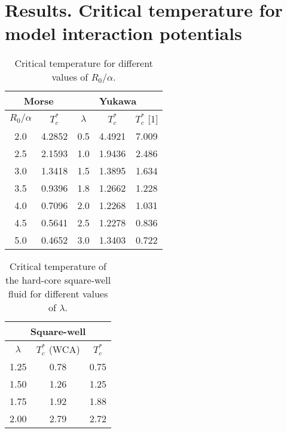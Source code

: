 \section{\label{sec:results}Results. Critical temperature for model interaction potentials}

\begin{table}[h]
	\caption{Critical temperature for different values of $R_0/\alpha$.}
	\begin{center}
		\begin{tabular}{|c|c|c|c|c|}
			\hline
			\multicolumn{2}{|c|}{Morse} & \multicolumn{3}{|c|}{Yukawa}\\
			\hline
			$R_0/\alpha$ \quad & $T_c^*$ \quad & $\lambda$ & $T_c^*$ & $T_c^*$ [1] \\
			\hline
			2.0  & 4.2852 & 0.5 & 4.4921 & 7.009 \\
			2.5  & 2.1593 & 1.0 & 1.9436 & 2.486 \\
			3.0  & 1.3418 & 1.5 & 1.3895 & 1.634 \\
			3.5  & 0.9396 & 1.8 & 1.2662 & 1.228 \\
			4.0  & 0.7096 & 2.0 & 1.2268 & 1.031 \\
			4.5  & 0.5641 & 2.5 & 1.2278 & 0.836 \\
			5.0  & 0.4652 & 3.0 & 1.3403 & 0.722 \\
			\hline
		\end{tabular}
	\end{center}
	\label{tab:morse_temp_cr}
\end{table}

\begin{table}[h]
	\caption{Critical temperature of the hard-core square-well fluid for different values of $\lambda$.}
	\begin{center}
		\begin{tabular}{|c|c|c|}
			\hline
			\multicolumn{3}{|c|}{Square-well}\\
			\hline
			$\lambda$ & $T_c^*$ (WCA) & $T_c^*$ \cite{KreiciNezbeda2012} \\
			\hline
			1.25 & 0.78 & 0.75 \\
			1.50 & 1.26 & 1.25 \\
			1.75 & 1.92 & 1.88 \\
			2.00  & 2.79 & 2.72 \\
			\hline
		\end{tabular}
	\end{center}
	\label{tab:sw_temp_cr}
\end{table}

